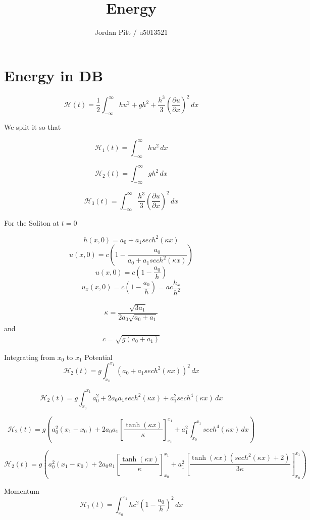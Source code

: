 \documentclass[12pt]{article}
\begin{document}
\title{Energy}
\author{Jordan Pitt / u5013521}

\section{Energy in DB}

\[\mathcal{H} (t) = \frac{1}{2}\int_{-\infty}^{\infty} hu^2 + gh^2 + \frac{h^3}{3} \left(\frac{\partial u}{\partial x}\right)^2\, dx \]

We split it so that 

\[\mathcal{H}_1 (t) = \int_{-\infty}^{\infty} hu^2 \, dx\]


\[\mathcal{H}_2 (t) = \int_{-\infty}^{\infty} gh^2 \, dx\]

\[\mathcal{H}_3 (t) = \int_{-\infty}^{\infty}\frac{h^3}{3} \left(\frac{\partial u}{\partial x}\right)^2\, dx\]

For the Soliton at $t = 0 $

\[h(x,0) = a_0 + a_1 sech^2\left(\kappa x\right)\]
\[u(x,0) = c\left(1 - \frac{a_0}{a_0 + a_1 sech^2\left(\kappa x\right)}\right)\]
\[u(x,0) = c\left(1 - \frac{a_0}{h}\right)\]
\[u_x(x,0) = c\left(1 - \frac{a_0}{h}\right) = ac \frac{h_x}{h^2}\]


\begin{gather}
\kappa = \dfrac{\sqrt{3a_1}}{2a_0 \sqrt{ a_0 + a_1}}
\end{gather}
and
\begin{gather}
c = \sqrt{g \left(a_0 + a_1\right)}
\end{gather}

Integrating from $x_0$ to $x_1$
Potential
\[\mathcal{H}_2 (t) = g\int_{x_0}^{x_1} \left(a_0 + a_1 sech^2\left(\kappa x\right) \right)^2 \, dx\]

\[\mathcal{H}_2 (t) = g\int_{x_0}^{x_1} a_0^2 + 2a_0a_1 sech^2\left(\kappa x\right) + a_1^2 sech^4\left(\kappa x\right)\, dx\]

\[\mathcal{H}_2 (t) = g\left( a_0^2 \left(x_1 - x_0\right) +2a_0a_1 \left[\frac{\tanh\left(\kappa x\right)}{\kappa}\right]_{x_0}^{x_1} + a_1^2\int_{x_0}^{x_1} sech^4\left(\kappa x\right)\, dx \right)\]

\[\mathcal{H}_2 (t) = g\left( a_0^2 \left(x_1 - x_0\right) +2a_0a_1 \left[\frac{\tanh\left(\kappa x\right)}{\kappa}\right]_{x_0}^{x_1} + a_1^2\left[\frac{\tanh\left(\kappa x\right) \left(sech^2\left(\kappa x\right) + 2\right)}{3\kappa}\right]_{x_0}^{x_1} \right)\]

 Momentum
\[\mathcal{H}_1 (t) = \int_{x_0}^{x_1} hc^2\left(1 - \frac{a_0}{h}\right)^2 \, dx\]
\end{document}
